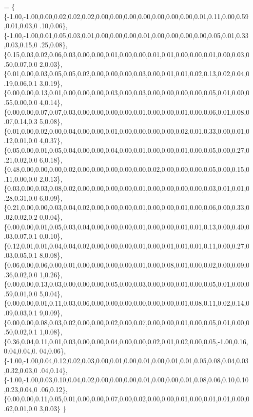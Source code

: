 \begin{DoxyCode}
= \{
        \{-1.00,-1.00,0.00,0.02,0.02,0.02,0.00,0.00,0.00,0.00,0.00,0.00,0.00,0.01,0.11,0.00,0.59,0.01,0.03,0
      .10,0.06\}, 
        \{-1.00,-1.00,0.01,0.05,0.03,0.01,0.00,0.00,0.00,0.01,0.00,0.00,0.00,0.00,0.05,0.01,0.33,0.03,0.15,0
      .25,0.08\}, 
        \{0.15,0.03,0.02,0.06,0.03,0.00,0.00,0.01,0.00,0.00,0.01,0.01,0.00,0.00,0.01,0.00,0.03,0.50,0.07,0.0
      2,0.03\}, 
        \{0.01,0.00,0.03,0.05,0.05,0.02,0.00,0.00,0.00,0.03,0.00,0.01,0.01,0.02,0.13,0.02,0.04,0.19,0.06,0.1
      3,0.19\}, 
        \{0.00,0.00,0.13,0.01,0.00,0.00,0.00,0.03,0.00,0.03,0.00,0.00,0.00,0.00,0.05,0.01,0.00,0.55,0.00,0.0
      4,0.14\}, 
        \{0.00,0.00,0.07,0.07,0.03,0.00,0.00,0.00,0.00,0.01,0.00,0.00,0.01,0.00,0.06,0.01,0.08,0.07,0.14,0.3
      5,0.08\}, 
        \{0.01,0.00,0.02,0.00,0.04,0.00,0.00,0.01,0.00,0.00,0.00,0.00,0.02,0.01,0.33,0.00,0.01,0.12,0.01,0.0
      4,0.37\}, 
        \{0.05,0.00,0.01,0.05,0.04,0.00,0.00,0.04,0.00,0.01,0.00,0.00,0.01,0.00,0.05,0.00,0.27,0.21,0.02,0.0
      6,0.18\}, 
        \{0.48,0.00,0.00,0.00,0.02,0.00,0.00,0.00,0.00,0.00,0.02,0.00,0.00,0.00,0.05,0.00,0.15,0.11,0.00,0.0
      2,0.13\}, 
        \{0.03,0.00,0.03,0.08,0.02,0.00,0.00,0.00,0.00,0.01,0.00,0.00,0.00,0.00,0.03,0.01,0.01,0.28,0.31,0.0
      6,0.09\}, 
        \{0.21,0.00,0.00,0.03,0.04,0.02,0.00,0.00,0.00,0.01,0.00,0.00,0.01,0.00,0.06,0.00,0.33,0.02,0.02,0.2
      0,0.04\}, 
        \{0.00,0.00,0.01,0.05,0.03,0.04,0.00,0.00,0.00,0.01,0.00,0.00,0.01,0.01,0.13,0.00,0.40,0.03,0.07,0.1
      0,0.10\}, 
        \{0.12,0.01,0.01,0.04,0.04,0.02,0.00,0.00,0.00,0.01,0.00,0.01,0.01,0.01,0.11,0.00,0.27,0.03,0.05,0.1
      8,0.08\}, 
        \{0.06,0.00,0.06,0.00,0.01,0.00,0.00,0.00,0.00,0.01,0.00,0.08,0.01,0.00,0.02,0.00,0.09,0.36,0.02,0.0
      1,0.26\}, 
        \{0.00,0.00,0.13,0.03,0.00,0.00,0.00,0.05,0.00,0.03,0.00,0.00,0.01,0.00,0.05,0.01,0.00,0.59,0.01,0.0
      5,0.04\}, 
        \{0.00,0.00,0.01,0.11,0.03,0.06,0.00,0.00,0.00,0.00,0.00,0.00,0.01,0.08,0.11,0.02,0.14,0.09,0.03,0.1
      9,0.09\}, 
        \{0.00,0.00,0.08,0.03,0.02,0.00,0.00,0.02,0.00,0.07,0.00,0.00,0.01,0.00,0.05,0.01,0.00,0.50,0.02,0.1
      1,0.08\}, 
        \{0.36,0.04,0.11,0.01,0.03,0.00,0.00,0.04,0.00,0.00,0.02,0.01,0.02,0.00,0.05,-1.00,0.16,0.04,0.04,0.
      04,0.06\}, 
        \{-1.00,-1.00,0.04,0.12,0.02,0.03,0.00,0.01,0.00,0.01,0.00,0.01,0.01,0.05,0.08,0.04,0.03,0.32,0.03,0
      .04,0.14\}, 
        \{-1.00,-1.00,0.03,0.10,0.04,0.02,0.00,0.00,0.00,0.01,0.00,0.00,0.01,0.08,0.06,0.10,0.10,0.23,0.04,0
      .06,0.12\},
        \{0.00,0.00,0.11,0.05,0.01,0.00,0.00,0.07,0.00,0.02,0.00,0.00,0.01,0.00,0.01,0.01,0.00,0.62,0.01,0.0
      3,0.03\} 
    \}
\end{DoxyCode}


